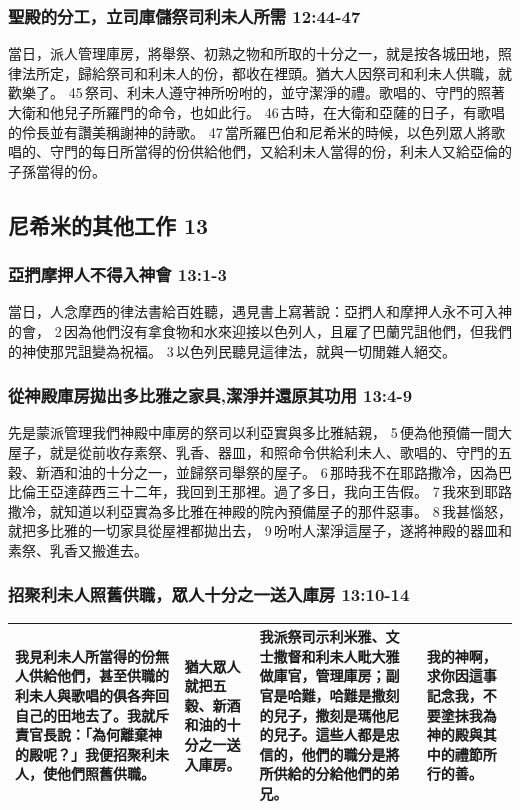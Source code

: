 \subsubsection{聖殿的分工，立司庫儲祭司利未人所需 12:44-47}
當日，派人管理庫房，將舉祭、初熟之物和所取的十分之一，就是按各城田地，照律法所定，歸給祭司和利未人的份，都收在裡頭。猶大人因祭司和利未人供職，就歡樂了。 45 祭司、利未人遵守神所吩咐的，並守潔淨的禮。歌唱的、守門的照著大衛和他兒子所羅門的命令，也如此行。 46 古時，在大衛和亞薩的日子，有歌唱的伶長並有讚美稱謝神的詩歌。 47 當所羅巴伯和尼希米的時候，以色列眾人將歌唱的、守門的每日所當得的份供給他們，又給利未人當得的份，利未人又給亞倫的子孫當得的份。

\subsection{尼希米的其他工作 13}	 
\subsubsection{亞捫摩押人不得入神會 13:1-3}	
當日，人念摩西的律法書給百姓聽，遇見書上寫著說：亞捫人和摩押人永不可入神的會， 2 因為他們沒有拿食物和水來迎接以色列人，且雇了巴蘭咒詛他們，但我們的神使那咒詛變為祝福。 3 以色列民聽見這律法，就與一切閒雜人絕交。

\subsubsection{從神殿庫房拋出多比雅之家具,潔淨并還原其功用 13:4-9}
先是蒙派管理我們神殿中庫房的祭司以利亞實與多比雅結親， 5 便為他預備一間大屋子，就是從前收存素祭、乳香、器皿，和照命令供給利未人、歌唱的、守門的五穀、新酒和油的十分之一，並歸祭司舉祭的屋子。 6 那時我不在耶路撒冷，因為巴比倫王亞達薛西三十二年，我回到王那裡。過了多日，我向王告假。 7 我來到耶路撒冷，就知道以利亞實為多比雅在神殿的院內預備屋子的那件惡事。 8 我甚惱怒，就把多比雅的一切家具從屋裡都拋出去， 9 吩咐人潔淨這屋子，遂將神殿的器皿和素祭、乳香又搬進去。

\subsubsection{招聚利未人照舊供職，眾人十分之一送入庫房 13:10-14}
\begin{table}[H]
  \centering
    \begin{tabular}{p{}|p{}|p{16.75em}|p{7.25em}}    \toprule
我見利未人所當得的份無人供給他們，甚至供職的利未人與歌唱的俱各奔回自己的田地去了。我就斥責官長說：「為何離棄神的殿呢？」我便招聚利未人，使他們照舊供職。
&猶大眾人就把五穀、新酒和油的十分之一送入庫房。
&我派祭司示利米雅、文士撒督和利未人毗大雅做庫官，管理庫房；副官是哈難，哈難是撒刻的兒子，撒刻是瑪他尼的兒子。這些人都是忠信的，他們的職分是將所供給的分給他們的弟兄。
&我的神啊，求你因這事記念我，不要塗抹我為神的殿與其中的禮節所行的善。\\   \bottomrule
    \end{tabular}%
\end{table}%


